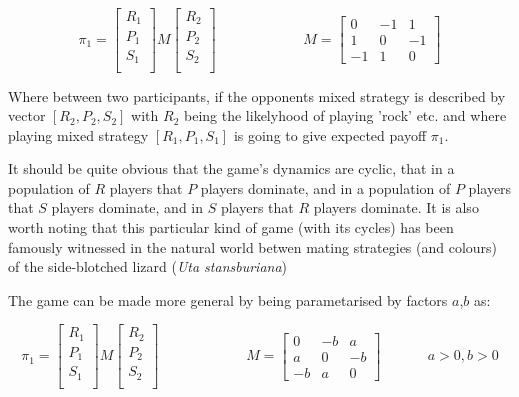 \documentclass[journal,article,accept,oneauthors,pdftex,10pt,a4paper]{mdpi}
\begin{document}
$$ \pi_1=\begin{bmatrix}
    R_1 \\
    P_1 \\
    S_1 \\
\end{bmatrix}
M
\begin{bmatrix}
    R_2 \\
    P_2 \\
    S_2 \\
\end{bmatrix} ~~~~~~~~~~~~~~~~~~~~~~~~~~~~M=\begin{bmatrix}
    0&-1&1\\
    1&0&-1\\
    -1&1&0
\end{bmatrix} $$

Where between two participants, if the opponents mixed strategy is described by vector $[R_2,P_2,S_2]$ with $R_2$ being the likelyhood of playing 'rock' etc.
and where playing mixed strategy $[R_1,P_1,S_1]$ is going to give expected payoff $\pi_1$.

It should be quite obvious that the game's dynamics are cyclic, that in a population of $R$ players that $P$ players dominate, and in a population of $P$ players that $S$ players dominate, and in $S$ players that $R$ players dominate. It is also worth noting that this particular kind of game (with its cycles) has been famously witnessed in the natural world betwen mating strategies (and colours) of the side-blotched lizard (\textit{Uta stansburiana})\cite{lizards1}

The game can be made more general by being parametarised by factors $a$,$b$ as:

$$ \pi_1=\begin{bmatrix}
    R_1 \\
    P_1 \\
    S_1 \\
\end{bmatrix}
M
\begin{bmatrix}
    R_2 \\
    P_2 \\
    S_2 \\
\end{bmatrix} ~~~~~~~~~~~~~~~~~~~~~~~~~~~~M= \begin{bmatrix}
    0&-b&a\\
    a&0&-b\\
    -b&a&0
\end{bmatrix}~~~~~~~~~~~~~~~a>0,b>0 $$
\end{document}
